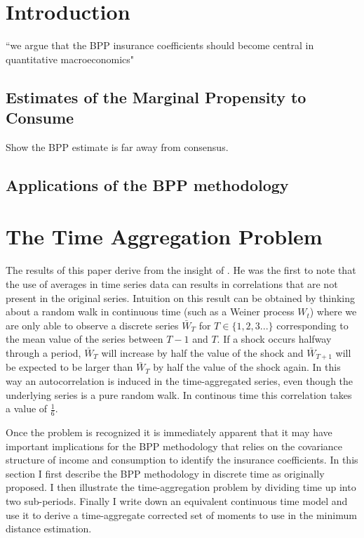 \documentclass[titlepage]{\econtex}\newcommand{\texname}{BPP_PSID_TimeAgg}
\begin{document}
\titlepagefinish
\setcounter{page}{1}

\pagebreak


\section{Introduction}
\cite{blundell_consumption_2008} 
\cite{working_note_1960}
\cite{kaplan_how_2010} ``we argue that the BPP insurance coefficients should become central in quantitative macroeconomics"
\subsection{Estimates of the Marginal Propensity to Consume}
Show the BPP estimate is far away from consensus. \cite{jappelli_consumption_2010}

\subsection{Applications of the BPP methodology}
\cite{violante_wealthy_2014}
\cite{auclert_monetary_2015}

\section{The Time Aggregation Problem}
The results of this paper derive from the insight of \cite{working_note_1960}. He was the first to note that the use of averages in time series data can results in correlations that are not present in the original series. Intuition on this result can be obtained by thinking about a random walk in continuous time (such as a Weiner process $W_t$) where we are only able to observe a discrete series $\bar{W}_T$ for $T \in \{1,2,3...\}$ corresponding to the mean value of the series between $T-1$ and $T$. If a shock occurs halfway through a period, $\bar{W}_T$ will increase by half the value of the shock and $\bar{W}_{T+1}$ will be expected to be larger than $\bar{W}_T$ by half the value of the shock again. In this way an autocorrelation is induced in the time-aggregated series, even though the underlying series is a pure random walk. In continous time this correlation takes a value of $\frac{1}{6}$.

Once the problem is recognized it is immediately apparent that it may have important implications for the BPP methodology that relies on the covariance structure of income and consumption to identify the insurance coefficients. In this section I first describe the BPP methodology in discrete time as originally proposed. I then illustrate the time-aggregation problem by dividing time up into two sub-periods. Finally I write down an equivalent continuous time model and use it to derive a time-aggregate corrected set of moments to use in the minimum distance estimation.
\end{document}
